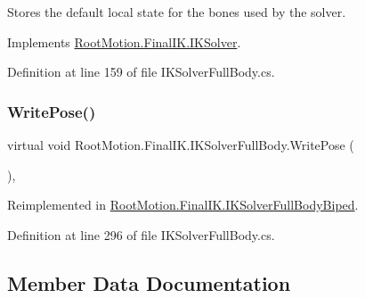 Stores the default local state for the bones used by the solver. 



Implements \mbox{\hyperlink{class_root_motion_1_1_final_i_k_1_1_i_k_solver_a5009a12837b12c96fed91bc6dc0bd4b6}{Root\+Motion.\+Final\+I\+K.\+I\+K\+Solver}}.



Definition at line 159 of file I\+K\+Solver\+Full\+Body.\+cs.

\mbox{\label{class_root_motion_1_1_final_i_k_1_1_i_k_solver_full_body_a08443a6f8b4f9dcfc4d0e5e8426ada7a}} 
\subsubsection{\texorpdfstring{Write\+Pose()}{WritePose()}}
{\footnotesize\ttfamily virtual void Root\+Motion.\+Final\+I\+K.\+I\+K\+Solver\+Full\+Body.\+Write\+Pose (\begin{DoxyParamCaption}{ }\end{DoxyParamCaption})\hspace{0.3cm}{\ttfamily [protected]}, {\ttfamily [virtual]}}



Reimplemented in \mbox{\hyperlink{class_root_motion_1_1_final_i_k_1_1_i_k_solver_full_body_biped_aaf274661bb29e50507fdf3f3f33473b6}{Root\+Motion.\+Final\+I\+K.\+I\+K\+Solver\+Full\+Body\+Biped}}.



Definition at line 296 of file I\+K\+Solver\+Full\+Body.\+cs.



\subsection{Member Data Documentation}
\mbox{\label{class_root_motion_1_1_final_i_k_1_1_i_k_solver_full_body_a5c0dfff5a382d7386bfe163ecdee1410}} 
